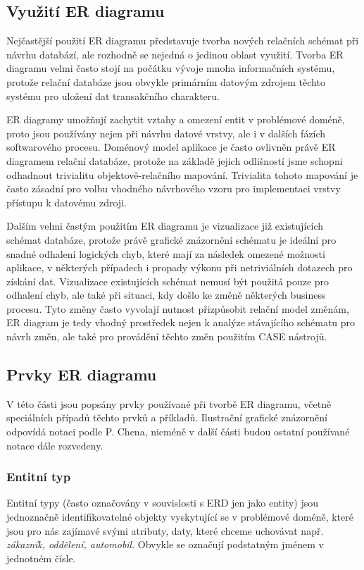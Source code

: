 \documentclass[czech,bachelor,public,dept460,male,oneside]{diploma}
\begin{document}
	\subsection{Využití ER diagramu}
	Nejčastější použití ER diagramu představuje tvorba nových relačních schémat při návrhu databází, ale rozhodně se nejedná o jedinou oblast využití. Tvorba ER diagramu velmi často stojí na počátku vývoje mnoha informačních systému, protože relační databáze jsou obvykle primárním datovým zdrojem těchto systému pro uložení dat transakčního charakteru. 
	
	ER diagramy umožňují zachytit vztahy a omezení entit v problémové doméně, proto jsou používány nejen při návrhu datové vrstvy, ale i v dalších fázích softwarového procesu. Doménový model aplikace je často ovlivněn právě ER diagramem relační databáze, protože na základě jejich odlišností jsme schopni odhadnout trivialitu objektově-relačního mapování. Trivialita tohoto mapování je často zásadní pro volbu vhodného návrhového vzoru pro implementaci vrstvy přístupu k datovému zdroji.
	
	Dalším velmi častým použitím ER diagramu je vizualizace již existujících schémat databáze, protože právě grafické znázornění schématu je ideální pro snadné odhalení logických chyb, které mají za následek omezené možnosti aplikace, v některých případech i propady výkonu při netriviálních dotazech pro získání dat. 
	Vizualizace existujících schémat nemusí být použitá pouze pro odhalení chyb, ale také při situaci, kdy došlo ke změně některých business procesu. Tyto změny často vyvolají nutnost přizpůsobit relační model změnám, ER diagram je tedy vhodný prostředek nejen k analýze stávajícího schématu pro návrh změn, ale také pro provádění těchto změn použitím CASE nástrojů.
	
	\subsection{Prvky ER diagramu}
	V této části jsou popsány prvky používané při tvorbě ER diagramu, včetně speciálních případů těchto prvků a příkladů. Ilustrační grafické znázornění odpovídá notaci podle P. Chena, nicméně v další části budou ostatní používané notace dále rozvedeny.
	
	\subsubsection{Entitní typ}
	Entitní typy (často označovány v souvislosti s ERD jen jako entity) jsou jednoznačně identifikovatelné objekty vyskytující se v problémové doméně, které jsou pro nás zajímavé svými atributy, daty, které chceme uchovávat např. \textit{zákazník, oddělení, automobil}. Obvykle se označují podstatným jménem v jednotném čísle. 
	
\end{document}

